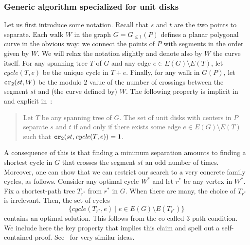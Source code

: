 \documentclass[a4paper,11pt]{article}
\newcommand{\GG}{\ensuremath{G_{\le 1}}}
\newcommand{\cycle}{\mathit{cycle}}
\newcommand\CR{\mbox{\tt cr}_2}		  %
\let\le\leqslant
\begin{document}
\subsubsection{Generic algorithm specialized for unit disks}
\label{sec:generic}
Let us first introduce some notation.
Recall that $s$ and $t$ are the two points to separate.
Each walk $W$ in the graph $G=\GG(P)$ defines a planar polygonal curve
in the obvious way: we connect the points of $P$ 
with segments in the order given by $W$. 
We will relax the notation slightly and denote also by $W$ the curve itself.
For any spanning tree $T$ of $G$ and any edge $e\in E(G)\setminus E(T)$, 
let $\cycle(T,e)$ be the unique cycle in $T+e$.
Finally, for any walk in $G(P)$, let $\CR (st,W)$ be the 
modulo $2$ value of the number of crossings between the segment $st$ 
and (the curve defined by) $W$.
The following property is implicit in~\cite{CG16} and explicit in~\cite{CK15}:
\begin{quote}
	Let $T$ be any spanning tree of $G$.
	The set of unit disks with centers in $P$ separate $s$ and $t$ if and only
	if there exists some edge $e\in E(G)\setminus E(T)$ 
	such that $\CR (st, \cycle(T,e))=1$.
\end{quote}

A consequence of this is that finding a minimum separation amounts 
to finding a shortest cycle in $G$ that crosses the segment $st$ an odd number of times.
Moreover, one can show that we can restrict our search to 
a very concrete family cycles, as follows. 
Consider any optimal cycle $W^*$ and let $r^*$ be any vertex in $W^*$.
Fix a shortest-path tree $T_{r^*}$ from $r^*$ in $G$.
When there are many, the choice of $T_{r^*}$ is irrelevant. 
Then, the set of cycles 
\[
	\{ \cycle(T_{r^*},e)\mid e\in E(G)\setminus E(T_{r^*})\}
\]
contains an optimal solution.
This follows from the co-called 3-path condition.
We include here the key property that implies this claim and
spell out a self-contained proof. See~\cite{CG16} for very similar ideas.
\end{document}
